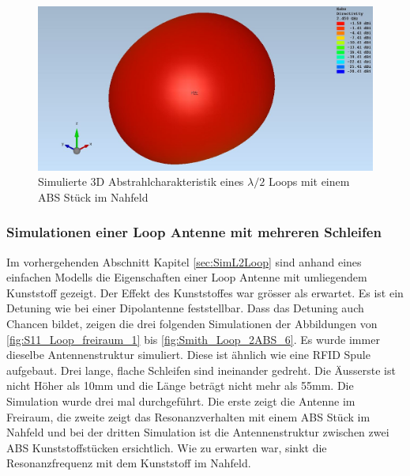 \begin{figure}[h]
	\centering
	\includegraphics[width=13cm]{content/bilder/Evaluation/Loop/L2/2ABS/EM_Far_Field_Loop_Lambda2_mit2ABS.JPG}%
	\caption{Simulierte 3D Abstrahlcharakteristik eines $\lambda/2$ Loops mit einem ABS Stück im Nahfeld}
	\label{fig:sim_Loop_freiraum_3D_2ABS}
\end{figure}

\newpage
\subsubsection{Simulationen einer Loop Antenne mit mehreren Schleifen}
Im vorhergehenden Abschnitt Kapitel \ref{sec:SimL2Loop} sind anhand eines einfachen Modells die Eigenschaften einer Loop Antenne mit umliegendem Kunststoff gezeigt. Der Effekt des Kunststoffes war grösser als erwartet. Es ist ein Detuning wie bei einer Dipolantenne feststellbar. Dass das Detuning auch Chancen bildet, zeigen die drei folgenden Simulationen der Abbildungen von \ref{fig:S11_Loop_freiraum_1} bis \ref{fig:Smith_Loop_2ABS_6}. Es wurde immer dieselbe Antennenstruktur simuliert. Diese ist ähnlich wie eine RFID Spule aufgebaut. Drei lange, flache Schleifen sind ineinander gedreht. Die Äusserste ist nicht Höher als 10mm und die Länge beträgt nicht mehr als 55mm. Die Simulation wurde drei mal durchgeführt. Die erste zeigt die Antenne im Freiraum, die zweite zeigt das Resonanzverhalten mit einem ABS Stück im Nahfeld und bei der dritten Simulation ist die Antennenstruktur zwischen zwei ABS Kunststoffstücken ersichtlich. Wie zu erwarten war, sinkt die Resonanzfrequenz mit dem Kunststoff im Nahfeld. 


